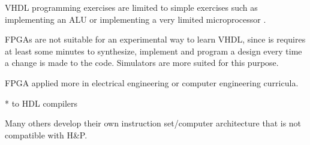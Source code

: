 \documentclass[openright]{template/uva-bachelor-thesis}
\begin{document}
VHDL programming exercises are limited to simple exercises such as implementing an ALU \cite{el2011teaching} or implementing a very limited microprocessor \cite{nativeFPGA}. 

FPGAs are not suitable for an experimental way to learn VHDL, since is requires at least some minutes to synthesize, implement and program a design every time a change is made to the code. Simulators are more suited for this purpose. 

FPGA applied more in electrical engineering or computer engineering curricula.

* to HDL compilers

Many others develop their own instruction set/computer architecture that is not compatible with H\&P.








\end{document}
